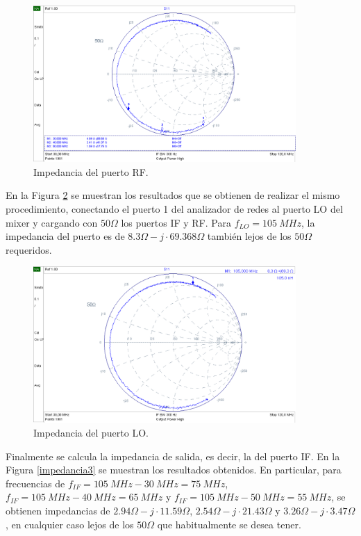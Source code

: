 \documentclass[a4paper,10pt]{article}
\begin{document}
	\begin{figure}[!htb]
		\centering
		\includegraphics[width=10cm]{Images/impedanciaRF.png}
		\caption{Impedancia del puerto RF.}
		\label{impedancia1}
	\end{figure}
	
	\indent En la Figura \ref{impedancia2} se muestran los resultados que se obtienen de
	realizar el mismo procedimiento, conectando el puerto 1 del analizador de 
	redes al puerto LO del mixer y cargando con $50\Omega$ los puertos IF y RF. 
	Para $f_{LO}=105~MHz$, la impedancia del puerto es de 
	$8.3\Omega-j\cdot69.368\Omega$ tambi\'en lejos de los $50\Omega$ requeridos.
	
	\begin{figure}[!htb]
		\centering
		\includegraphics[width=10cm]{Images/impedanciaLO.png}
		\caption{Impedancia del puerto LO.}
		\label{impedancia2}		
	\end{figure}
	
	\indent Finalmente se calcula la impedancia de salida, es decir, la del 
	puerto IF. En la Figura \ref{impedancia3} se muestran los resultados 
	obtenidos. En particular, para  frecuencias de 
	$f_{IF}=105~MHz-30~MHz=75~MHz$, $f_{IF}=105~MHz-40~MHz=65~MHz$ y 
	$f_{IF}=105~MHz-50~MHz=55~MHz$, se obtienen impedancias de 
	$2.94\Omega-j\cdot11.59\Omega$, $2.54\Omega-j\cdot21.43\Omega$ y 
	$3.26\Omega-j\cdot3.47\Omega$, en cualquier caso lejos de los $50\Omega$ que
	habitualmente se desea tener.
	
\end{document}
